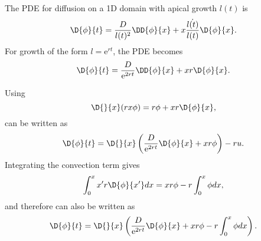 The PDE for diffusion on a 1D domain with apical growth $l(t)$ is
%
\begin{equation}
\D{\phi}{t} = \frac{D}{l(t)^2} \DD{\phi}{x} + x \frac{\dot{l(t)}}{l(t)} \D{\phi}{x} .
\end{equation}
%
For growth of the form $l = \mathrm{e}^{rt}$, the PDE becomes
%
\begin{equation}
\D{\phi}{t} = \frac{D}{\mathrm{e}^{2rt}} \DD{\phi}{x} + x r \D{\phi}{x} .
\label{eqn:exp_apical}
\end{equation}

Using
%
\begin{equation}
\D{}{x} (rx\phi) = r\phi + xr \D{\phi}{x},
\end{equation}
%
 can be written as
%
\begin{equation}
\D{\phi}{t} = \D{}{x}\left( \frac{D}{\mathrm{e}^{2rt}}\D{\phi}{x} + xr \phi \right) - ru .
\end{equation}
%
Integrating the convection term gives
\begin{equation}
\int_0^x x'r\D{\phi}{x'} dx = xr\phi - r\int_0^x \phi dx ,
\end{equation}
%
and therefore  can also be written as
%
\begin{equation}
\D{\phi}{t} = \D{}{x}\left( \frac{D}{\mathrm{e}^{2rt}}\D{\phi}{x} + xr \phi - r\int_0^x \phi dx \right) .
\end{equation}
